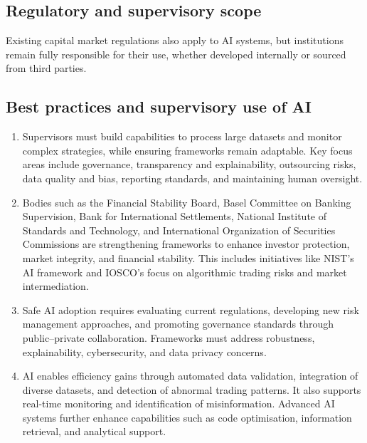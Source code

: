 \subsection*{Regulatory and supervisory scope}

Existing capital market regulations also apply to AI systems, but institutions remain fully
responsible for their use, whether developed internally or sourced from third parties.

\subsection*{Best practices and supervisory use of AI}

\begin{enumerate}[label=\textbf{\alph*)}]
\item {}
Supervisors must build capabilities to process large datasets and monitor complex
strategies, while ensuring frameworks remain adaptable. Key focus areas include governance,
transparency and explainability, outsourcing risks, data quality and bias, reporting
standards, and maintaining human oversight.
\item {} Bodies such as the Financial Stability Board, Basel
Committee on Banking Supervision, Bank for International Settlements, National Institute of
Standards and Technology, and International Organization of Securities Commissions are
strengthening frameworks to enhance investor protection, market integrity, and financial
stability. This includes initiatives like NIST's AI framework and IOSCO's focus on
algorithmic trading risks and market intermediation.
\item {} Safe AI adoption requires evaluating
current regulations, developing new risk management approaches, and promoting governance
standards through public--private collaboration. Frameworks must address robustness,
explainability, cybersecurity, and data privacy concerns.
\item {} AI enables efficiency gains through automated data
validation, integration of diverse datasets, and detection of abnormal trading patterns. It
also supports real-time monitoring and identification of misinformation. Advanced AI systems
further enhance capabilities such as code optimisation, information retrieval, and analytical
support.
\end{enumerate}

